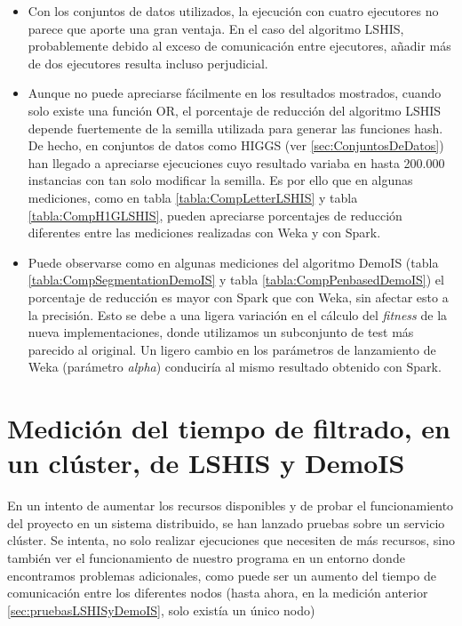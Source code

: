 \begin{itemize}
		\item Con los conjuntos de datos utilizados, la ejecución con cuatro ejecutores no parece que aporte una gran ventaja. En el caso del algoritmo LSHIS, probablemente debido al exceso de comunicación entre ejecutores, añadir más de dos ejecutores resulta incluso perjudicial. 
		
	\item Aunque no puede apreciarse fácilmente en los resultados mostrados, cuando solo existe una función OR, el porcentaje de reducción del algoritmo LSHIS depende fuertemente de la semilla utilizada para generar las funciones hash. De hecho, en conjuntos de datos como HIGGS (ver \ref{sec:ConjuntosDeDatos}) han llegado a apreciarse ejecuciones cuyo resultado variaba en hasta 200.000 instancias con tan solo modificar la semilla. Es por ello que en algunas mediciones, como en tabla \ref{tabla:CompLetterLSHIS} y tabla \ref{tabla:CompH1GLSHIS}, pueden apreciarse porcentajes de reducción diferentes entre las mediciones realizadas con Weka y con Spark. 
	
	\item Puede observarse como en algunas mediciones del algoritmo DemoIS (tabla \ref{tabla:CompSegmentationDemoIS} y tabla \ref{tabla:CompPenbasedDemoIS}) el porcentaje de reducción es mayor con Spark que con Weka, sin afectar esto a la precisión. Esto se debe a una ligera variación en el cálculo del \textit{fitness} de la nueva implementaciones, donde utilizamos un subconjunto de test más parecido al original. Un ligero cambio en los parámetros de lanzamiento de Weka (parámetro \textit{alpha}) conduciría al mismo resultado obtenido con Spark.
	
\end{itemize}


\section{Medición del tiempo de filtrado, en un clúster, de LSHIS y DemoIS}

En un intento de aumentar los recursos disponibles y de probar el funcionamiento del proyecto en un sistema distribuido, se han lanzado pruebas sobre un servicio clúster. Se intenta, no solo realizar ejecuciones  que necesiten de más recursos, sino también ver el funcionamiento de nuestro programa en un entorno donde encontramos problemas adicionales, como puede ser un aumento del tiempo de comunicación entre los diferentes nodos (hasta ahora, en la medición anterior \ref{sec:pruebasLSHISyDemoIS}, solo existía un único nodo)

